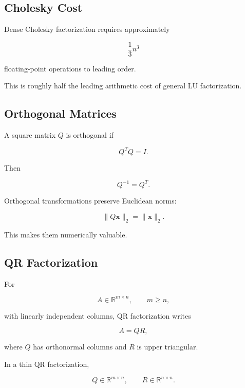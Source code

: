 \subsection{Cholesky Cost}
\label{subsec:cholesky-cost}

Dense Cholesky factorization requires approximately

\[
\boxed{
\frac{1}{3}n^3
}
\]

floating-point operations to leading order.

This is roughly half the leading arithmetic cost of general LU
factorization.

\subsection{Orthogonal Matrices}
\label{subsec:numerical-orthogonal-matrices}

A square matrix \(Q\) is orthogonal if

\[
\boxed{
Q^TQ=I.
}
\]

Then

\[
\boxed{
Q^{-1}=Q^T.
}
\]

Orthogonal transformations preserve Euclidean norms:

\[
\boxed{
\|Q\mathbf{x}\|_2
=
\|\mathbf{x}\|_2.
}
\]

This makes them numerically valuable.

\subsection{QR Factorization}
\label{subsec:qr-factorization}

For

\[
A\in\mathbb{R}^{m\times n},
\qquad
m\geq n,
\]

with linearly independent columns, QR factorization writes

\[
\boxed{
A
=
QR,
}
\]

where \(Q\) has orthonormal columns and \(R\) is upper triangular.

In a thin QR factorization,

\[
\boxed{
Q\in\mathbb{R}^{m\times n},
\qquad
R\in\mathbb{R}^{n\times n}.
}
\]

